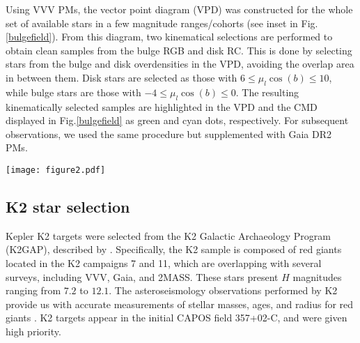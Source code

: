 \documentclass[onecolumn]{aa}
\begin{document}
Using VVV PMs,
the vector point diagram (VPD) was constructed for the whole set of
available stars in a few magnitude ranges/cohorts (see inset in
Fig.\ref{bulgefield}). From this diagram, two kinematical selections are performed to
obtain clean samples from the bulge RGB and disk RC. This is done by
selecting stars from the bulge and disk overdensities in the VPD, avoiding
the overlap area in between them. Disk stars are selected as those with
$6\leq \mu_l \cos(b)\leq 10$, while bulge stars are those with $-4\leq \mu_l
\cos(b)\leq 0$. The resulting kinematically selected samples are highlighted in the VPD and the CMD displayed in Fig.\ref{bulgefield} as green and cyan dots, respectively. For subsequent observations, we used the same procedure but supplemented with Gaia DR2 PMs.

\begin{figure*}
\centering
   \sidecaption
   \texttt{[image: figure2.pdf]}
      \caption{Selection function of bulge and disk field giants. \textit{Main panel:} Annotated CMD of a typical bulge field (003-03-C) is shown as a Hess diagram. The horizontal red dashed lines indicate the magnitude limits adopted to select cohorts, as described in the main text. \textit{Inset panel: }$\mu_l \cos(b)$~vs.~$\mu_b$ VVV PM diagram. The black points correspond to a random 2500 field star subsample with small errors in PMs. The cyan (green) points in both panels display the kinematically selected bulge (disk) giants from the magnitude ranges displayed in the main panel.}
    \label{bulgefield}
\end{figure*}

\subsection{K2 star selection}
Kepler K2 targets were selected from the K2 Galactic Archaeology Program (K2GAP), described by \citet{Stello2015, Stello2017}. Specifically, the K2 sample is composed of  red giants located in the K2 campaigns 7 and 11, which are overlapping with several surveys, including VVV, Gaia, and 2MASS. These stars present $H$ magnitudes ranging from $7.2$ to $12.1$. The asteroseismology observations performed by K2  provide us with accurate measurements of stellar masses, ages,  and radius for red  giants \citep{Kallinger2010}. 
K2 targets appear in the initial CAPOS field 357+02-C, and were given high priority.
\end{document}
